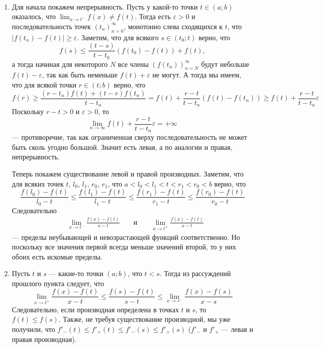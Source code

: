 \documentclass[12pt,a4paper]{article}
\begin{document}
    \begin{enumproblem}\ 
        \begin{enumerate}
            \item Для начала покажем непрерывность. Пусть у какой-то точки $t \in (a; b)$ оказалось, что $\lim_{x \to t^-} f(x)  \neq f(t)$. Тогда есть $\varepsilon > 0$ и последовательность точек $(t_n)_{n=0}^\infty$, монотонно слева сходящихся к $t$, что $|f(t_n) - f(t)| \geqslant \varepsilon$. Заметим, что для всякого $s \in (t_0; t)$ верно, что
            \[f(s) \leqslant \frac{(t - s)}{t - t_0} (f(t_0) - f(t)) + f(t),\]
            а тогда начиная для некоторого $N$ все члены $(f(t_n))_{n=N}^\infty$ будут небольше $f(t) - \varepsilon$, так как быть неменьше $f(t) + \varepsilon$ не могут. А тогда мы имеем, что для всякой точки $r \in (t; b)$ верно, что
            \[
                f(r)
                \geqslant \frac{(r - t_n)f(t) + (t - r)f(t_n)}{t - t_n}
                = f(t) + \frac{r - t}{t - t_n}(f(t) - f(t_n))
                \geqslant f(t) + \frac{r - t}{t - t_n}\varepsilon
            \]
            Поскольку $r - t > 0$ и $\varepsilon > 0$, то
            \[\lim_{n\to \infty} f(t) + \frac{r - t}{t - t_n}\varepsilon = +\infty\]
            --- противоречие, так как ограниченная сверху последовательность не может быть сколь угодно большой. Значит есть левая, а по аналогии и правая, непрерывность.

            Теперь покажем существование левой и правой производных. Заметим, что для всяких точек $t$, $l_0$, $l_1$, $r_0$, $r_1$, что $a < l_0 < l_1 < t < r_1 < r_0 < b$ верно, что
            \[\frac{f(l_0) - f(t)}{l_0 - t} \leqslant \frac{f(l_1) - f(t)}{l_1 - t} \leqslant \frac{f(r_1) - f(t)}{r_1 - t} \leqslant \frac{f(r_0) - f(t)}{r_0 - t}\]
            Следовательно
            \begin{align*}
                &\lim_{x \to t^-} \frac{f(x) - f(t)}{x - t}&
                &\text{ и }&
                &\lim_{x \to t^+} \frac{f(x) - f(t)}{x - t}
            \end{align*}
            --- пределы неубывающей и невозрастающей функций соответственно. Но поскольку все значения первой всегда меньше значений второй, то у них обоих есть искомые пределы.

            \item Пусть $t$ и $s$ --- какие-то точки $(a; b)$, что $t < s$. Тогда из рассуждений прошлого пункта следует, что
            \[
                \lim_{x \to t^+} \frac{f(x) - f(t)}{x - t}
                \leqslant \frac{f(s) - f(t)}{s - t}
                \leqslant \lim_{x \to s^-} \frac{f(x) - f(s)}{x - s}
            \]
            Следовательно, если производная определена в точках $t$ и $s$, то $f(t) \leqslant f(s)$. Также, не требуя существование производной, мы уже получили, что $f'_-(t) \leqslant f'_+(t) \leqslant f'_-(s) \leqslant f'_+(s)$ ($f'_-$ и $f'_+$ --- левая и правая производная).


\end{enumerate}
\end{enumproblem}
\end{document}
